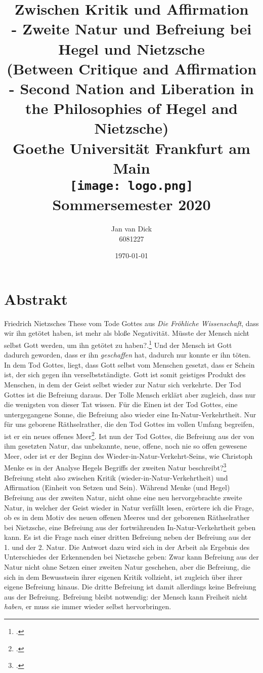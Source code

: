 \documentclass[12pt, a4paper, openany]{report}
\title{
    {Zwischen Kritik und Affirmation}\\ 
    {\large- Zweite Natur und Befreiung bei Hegel und Nietzsche}\\
    {\large(Between Critique and Affirmation - Second Nation and Liberation in the Philosophies of Hegel and Nietzsche)}\\
    {\bigskip}
    {\large Goethe Universität Frankfurt am Main}\\
    {\bigskip}    
    {\bigskip}    
    {\texttt{[image: logo.png]}}\\
    {\bigskip}    
    {Sommersemester 2020}\\
}
\author{
    {Jan van Dick}\\
    {6081227}
}
\date{\today}
\begin{document}
\maketitle
\frontmatter
\onehalfspacing

\chapter*{Abstrakt}
Friedrich Nietzsches These vom Tode Gottes aus \textit{Die Fröhliche Wissenschaft}, dass \glqq wir\grqq{} ihn getötet haben, ist mehr als bloße Negativität. 
Müsste der Mensch nicht selbst Gott werden, um ihn getötet zu haben?.\footcite[Vgl.][481]{nietzsche_morgenrote_1999} 
Und der Mensch ist Gott dadurch geworden, dass er ihn \textit{geschaffen} hat, dadurch nur konnte er ihn töten. 
In dem Tod Gottes, liegt, dass Gott selbst vom Menschen gesetzt, dass er Schein ist, der sich gegen ihn verselbstständigte.
Gott ist somit geistiges Produkt des Menschen, in dem der Geist selbst wieder zur Natur sich verkehrte.
Der Tod Gottes ist die Befreiung daraus.
Der \glqq Tolle Mensch\grqq{} erklärt aber zugleich, dass nur die wenigsten von dieser Tat wissen. 
Für die Einen ist der Tod Gottes, eine untergegangene Sonne, die Befreiung also wieder eine In-Natur-Verkehrtheit.
Nur für uns \glqq geborene Räthselrather\grqq, die den Tod Gottes im vollen Umfang begreifen, ist er ein \glqq neues offenes Meer\grqq\footcite[][573]{nietzsche_morgenrote_1999}.
Ist nun der Tod Gottes, die Befreiung aus der von ihm gesetzten Natur, das unbekannte, neue, offene, noch nie so offen gewesene Meer, oder ist er der Beginn des Wieder-in-Natur-Verkehrt-Seins, wie Christoph Menke es in der Analyse Hegels Begriffs der zweiten Natur beschreibt?\footcite[Vgl.][144]{menke_autonomie_2018}\\
Befreiung steht also zwischen Kritik (wieder-in-Natur-Verkehrtheit) und Affirmation (Einheit von Setzen und Sein).
Während Menke (und Hegel) Befreiung aus der zweiten Natur, nicht ohne eine neu hervorgebrachte zweite Natur, in welcher der Geist wieder in Natur verfällt lesen, erörtere ich die Frage, ob es in dem Motiv des \glqq neuen offenen Meeres\grqq{} und der \glqq geborenen Räthselrather\grqq{} bei Nietzsche, eine Befreiung aus der fortwährenden In-Natur-Verkehrtheit geben kann.
Es ist die Frage nach einer dritten Befreiung neben der Befreiung aus der 1. und der 2. Natur. 
Die Antwort dazu wird sich in der Arbeit als Ergebnis des Unterschiedes der \glqq Erkennenden\grqq{} bei Nietzsche geben:
Zwar kann Befreiung aus der Natur nicht ohne Setzen einer zweiten Natur geschehen, aber die Befreiung, die sich in dem Bewusstsein ihrer eigenen Kritik vollzieht, ist zugleich über ihrer eigene Befreiung hinaus.
Die dritte Befreiung ist damit allerdings keine Befreiung aus der Befreiung.
Befreiung bleibt notwendig: der Mensch kann Freiheit nicht \textit{haben}, er muss sie immer wieder selbst hervorbringen.
\end{document}
